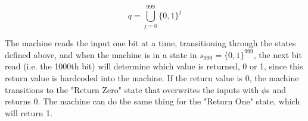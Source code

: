 \documentclass[11pt]{article}
\begin{document}
$$
q = \bigcup_{j=0}^{999}{\{0, 1\}^j}
$$

The machine reads the input one bit at a time, transitioning through the states defined above, and when the machine is in a state in $s_{999} = \{0, 1\}^{999}$, the next bit read (i.e. the 1000th bit) will determine which value is returned, 0 or 1, since this return value is hardcoded into the machine. If the return value is 0, the machine transitions to the "Return Zero" state that overwrites the inputs with $\phi$s and returns 0. The machine can do the same thing for the "Return One" state, which will return 1.
\end{document}
